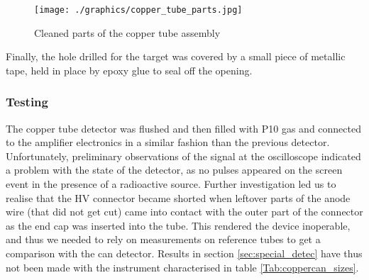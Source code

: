 \begin{figure}[htb!]
  \centering
  \texttt{[image: ./graphics/copper\_tube\_parts.jpg]}
  \caption{Cleaned parts of the copper tube assembly}
  \label{fig:copper_parts}
\end{figure}

Finally, the hole drilled for the target was covered by a small piece of metallic tape, held in place by epoxy glue to seal off the opening.

\subsubsection{Testing}

The copper tube detector was flushed and then filled with P10 gas and connected to the amplifier electronics in a similar fashion than the previous detector. Unfortunately, preliminary observations of the signal at the oscilloscope indicated a problem with the state of the detector, as no pulses appeared on the screen event in the presence of a radioactive source. Further investigation led us to realise that the HV connector became shorted when leftover parts of the anode wire (that did not get cut) came into contact with the outer part of the connector as the end cap was inserted into the tube. This rendered the device inoperable, and thus we needed to rely on measurements on reference tubes to get a comparison with the can detector. Results in section \ref{sec:special_detec} have thus not been made with the instrument characterised in table \ref{Tab:coppercan_sizes}.


